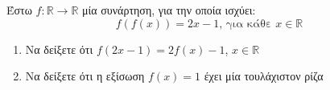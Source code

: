 \documentclass{presentation}
\begin{document}
\begin{askisi}
  Έστω $f:\mathbb{R}\to\mathbb{R}$ μία συνάρτηση, για την οποία ισχύει:
  $$f\left(f(x)\right)=2x-1\text{, για κάθε } x\in\mathbb{R}$$
  \begin{enumerate}
    \item<1-> Να δείξετε ότι $f(2x-1)=2f(x)-1$, $x\in\mathbb{R}$
    \item<2-> Να δείξετε ότι η εξίσωση $f(x)=1$ έχει μία τουλάχιστον ρίζα
  \end{enumerate}

\end{askisi}
\end{document}

